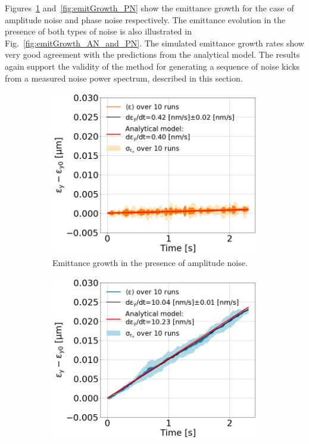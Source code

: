 Figures~\ref{fig:emitGrowth_AN} and~\ref{fig:emitGrowth_PN} show the emittance growth for the case of amplitude noise and phase noise respectively. The emittance evolution in the presence of both types of noise is also illustrated in Fig.~\ref{fig:emitGrowth_AN_and_PN}. The simulated emittance growth rates show very good agreement with the predictions from the analytical model. The results again support the validity of the method for generating a sequence of noise kicks from a measured noise power spectrum, described in this section.


\begin{figure}[!ht]
     \centering
     \begin{subfigure}[t]{0.45\textwidth}
         \centering
         \includegraphics[width=1\textwidth]{./images/app_B/emitGrowth_eyEvolution_sps_270GeV_WakesOFF_ayy1500_QpxQpy1_Nb5e5_IPACvalues_coast1_setting2_AN.png}
         \caption{Emittance growth in the presence of amplitude noise.}
         \label{fig:emitGrowth_AN}
     \end{subfigure}
     \hfill
     \begin{subfigure}[t]{0.45 \textwidth}
         \centering
         \includegraphics[width=1 \textwidth]{./images/app_B/emitGrowth_eyEvolution_sps_270GeV_WakesOFF_ayy1500_QpxQpy1_Nb5e5_IPACvalues_coast1_setting2_PN.png}

\end{subfigure}
\end{figure}
